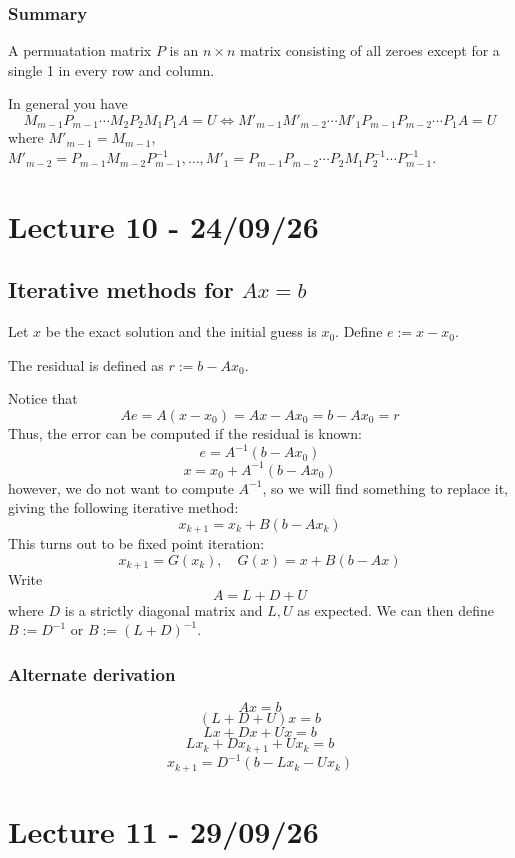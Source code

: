 \documentclass[11pt]{article}
\begin{document}
\begin{example}
    \subsubsection{Summary}
    \begin{definition}
        A permuatation matrix $P$ is an $n \times n$ matrix consisting of all zeroes except for a single 1 in every row and column.
    \end{definition}
    In general you have
    \[
        M_{m-1}P_{m-1}\cdots M_2P_2M_1P_1A = U \iff M'_{m-1}M'_{m-2}\cdots M'_1 P_{m-1}P_{m-2}\cdots P_1A = U
    \]
    where $M'_{m-1} = M_{m-1}$, $M'_{m-2}=P_{m-1}M_{m-2}P_{m-1}^{-1}, \dots, M'_1 = P_{m-1}P_{m-2}\cdots P_2M_1P_2^{-1}\cdots P_{m-1}^{-1}$.
    
\end{example}

\section{Lecture 10 - 24/09/26}
\subsection{Iterative methods for \texorpdfstring{$Ax=b$}{Ax=b}}
Let $x$ be the exact solution and the initial guess is $x_0$. Define $e := x- x_0$.
\begin{definition}
    The residual is defined as $r := b - Ax_0$.
\end{definition}
Notice that
\[
    Ae = A(x-x_0) = Ax - Ax_0 = b - Ax_0 = r
\]
Thus, the error can be computed if the residual is known:
\[
    e = A^{-1}(b-Ax_0)
\]
\[
    x = x_0 + A^{-1}(b-Ax_0)
\]
however, we do not want to compute $A^{-1}$, so we will find something to replace it, giving the following iterative method:
\[
    x_{k+1} = x_k + B(b-Ax_k)
\]
This turns out to be fixed point iteration:
\[
    x_{k+1} = G(x_k), \quad G(x) = x+B(b-Ax)
\]
Write 
\[
    A = L + D + U
\]
where $D$ is a strictly diagonal matrix and $L,U$ as expected. We can then define
$B := D^{-1}$ or $B := (L+D)^{-1}$.
\subsubsection{Alternate derivation}
\[
    Ax = b
\]
\[
    (L+D+U)x=b
\]
\[
    Lx+Dx+Ux=b 
\]
\[
    Lx_k + Dx_{k+1} + Ux_k = b
\]
\[
    x_{k+1} = D^{-1}(b-Lx_k-Ux_k)
\]

\section{Lecture 11 - 29/09/26}
\end{document}

